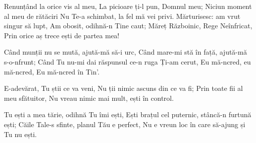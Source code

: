 \beginverse
Renunțând la orice vis al meu,
La picioare ți-l pun, Domnul meu;
Niciun moment al meu de rătăciri
Nu Te-a schimbat, la fel mă vei privi.
Mărturisesc: am vrut singur să lupt,
Am obosit, odihnă-n Tine caut;
Măreț Războinic, Rege Neînfricat,
Prin orice aș trece ești de partea mea!
\endverse

\beginchorus
Când munții nu se mută, ajută-mă să-i urc,
Când mare-mi stă în față, ajută-mă s-o-nfrunt;
Când Tu nu-mi dai răspunsul ce-n ruga Ți-am cerut,
Eu mă-ncred, eu mă-ncred,
Eu mă-ncred în Tin’.
\endchorus

\beginverse
E-adevărat, Tu știi ce va veni,
Nu ții nimic ascuns din ce va fi;
Prin toate fii al meu sfătuitor,
Nu vreau nimic mai mult, ești în control.
\endverse

\beginverse*
Tu ești a mea tărie, odihnă Tu îmi ești,
Ești brațul cel puternic, stâncă-n furtună ești;
Căile Tale-s sfinte, planul Tău e perfect,
Nu e vreun loc în care să-ajung și Tu nu ești.
\endverse
\endsong